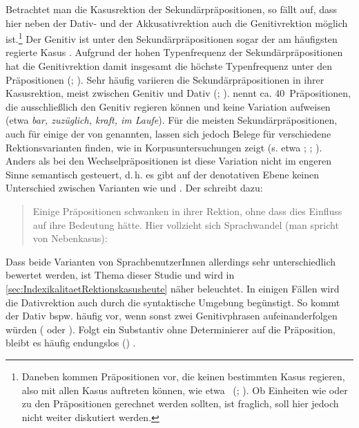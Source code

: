 Betrachtet man die Kasusrektion der Sekundärpräpositionen, so fällt auf, dass hier neben der Dativ- und der Akkusativrektion auch die Genitivrektion möglich ist.\footnote{Daneben kommen Präpositionen vor, die keinen bestimmten Kasus regieren, also mit allen Kasus auftreten können, wie etwa ~(\citealp[40--41]{Lindqvist1994}; \citealp[§919]{Duden2016}). Ob Einheiten wie  oder  zu den Präpositionen gerechnet werden sollten, ist fraglich, soll hier jedoch nicht weiter diskutiert werden.} 
Der Genitiv ist unter den Sekundärpräpositionen sogar der am häufigsten regierte Kasus \citep[s.][16]{Lehmann1992}. 
Aufgrund der hohen Typenfrequenz der Sekundärpräpositionen hat die Genitivrektion damit insgesamt die höchste Typenfrequenz unter den Präpositionen (\citealp[s.][131--132]{Eroms1981}; \citealp[638]{Griehaber2009}). 
Sehr häufig variieren die Sekundärpräpositionen in ihrer Kasusrektion, meist zwischen Genitiv und Dativ (\citealp[s.][§910]{Duden2016}; \citealp[zu Schwankungen bei historisch neuen Akkusativpr{\"a}positionen wie etwa \textit{pro} s.][]{Hentschel1989}). 
\citet[32]{Lindqvist1994} nennt ca. 40~Pr{\"a}positionen, die ausschlie{\ss}lich den Genitiv regieren können und keine Variation aufweisen (etwa \textit{bar, zuz{\"u}glich, kraft, im Laufe}). 
Für die meisten Sekundärpräpositionen, auch für einige der von \citet{Lindqvist1994} genannten, lassen sich jedoch Belege für verschiedene Rektionsvarianten finden, wie \citeauthor[]{DiMeola2000} in Korpusuntersuchungen zeigt (s. etwa \citeyear[]{DiMeola1999}; \citeyear{DiMeola2000}; \citeyear{DiMeola2006}). 
Anders als bei den Wechselpräpositionen ist diese Variation nicht im engeren Sinne semantisch gesteuert, d.\,h. es gibt auf der denotativen Ebene keinen Unterschied zwischen Varianten wie  und . 
Der \citet[]{Duden2016} schreibt dazu: 
\begin{quote}Einige Pr{\"a}positionen schwanken in ihrer Rektion, ohne dass dies Einfluss auf ihre Bedeutung h{\"a}tte. Hier vollzieht sich Sprachwandel (man spricht von Nebenkasus): ~\citep[{\S}910]{Duden2016}\end{quote}
Dass beide Varianten von SprachbenutzerInnen allerdings sehr unterschiedlich bewertet werden, ist Thema dieser Studie und wird in \autoref{sec:IndexikalitaetRektionskasusheute} näher beleuchtet. 
In einigen Fällen wird die Dativrektion auch durch die syntaktische Umgebung begünstigt. 
So kommt der Dativ bspw. häufig vor, wenn sonst zwei Genitivphrasen aufeinanderfolgen würden ( oder ). Folgt ein Substantiv ohne Determinierer auf die Präposition, bleibt es häufig endungslos () \citep[s.][§917--918]{Duden2016}. 

